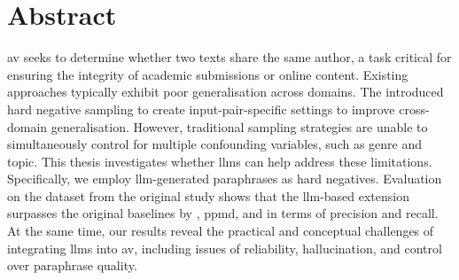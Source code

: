 \chapter*{Abstract}

\Acl{av} seeks to determine whether two texts share the same author, a task critical for ensuring the integrity of academic submissions or online content.
Existing approaches typically exhibit poor generalisation across domains.
The \impAppr{} introduced hard negative sampling to create input-pair-specific settings to improve cross-domain generalisation. 
However, traditional sampling strategies are unable to simultaneously control for multiple confounding variables, such as genre and topic.
This thesis investigates whether \aclp{llm} can help address these limitations. 
Specifically, we employ \acs{llm}-generated paraphrases as hard negatives. 
Evaluation on the \dataStudent{} dataset from the original study shows that the \acs{llm}-based extension surpasses the original baselines by \citet{koppel_determining_2014}, \acs{ppmd}, and \unmasking{} in terms of precision and recall.
At the same time, our results reveal the practical and conceptual challenges of integrating \acsp{llm} into \acl{av}, including issues of reliability, hallucination, and control over paraphrase quality.



